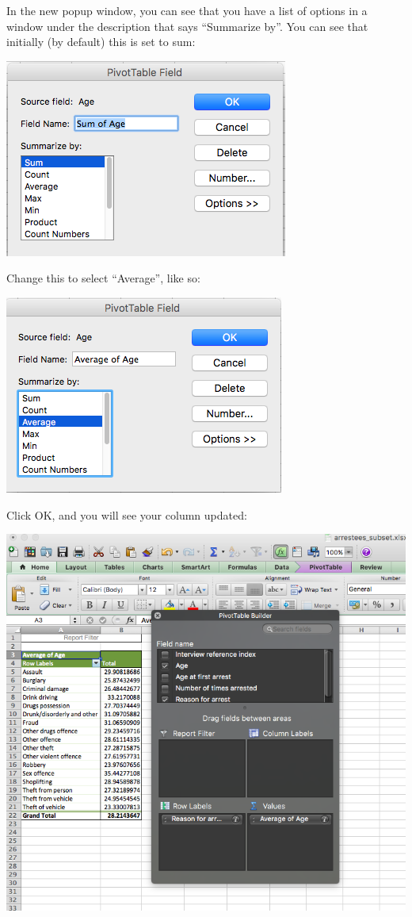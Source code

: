 \documentclass[
]{book}
\begin{document}
In the new popup window, you can see that you have a list of options in a window under the description that says ``Summarize by''. You can see that initially (by default) this is set to sum:

\includegraphics{imgs/set_to_sum.png}

Change this to select ``Average'', like so:

\includegraphics{imgs/set_to_avg.png}

Click OK, and you will see your column updated:

\includegraphics{imgs/is_now_avg_col.png}
\end{document}
